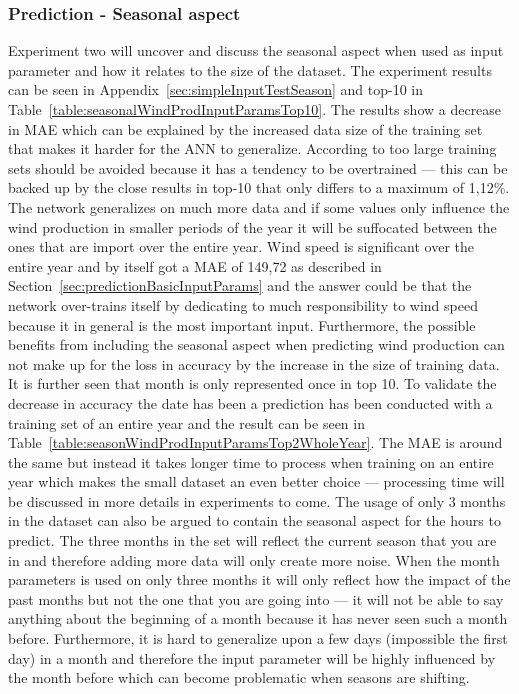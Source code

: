 \subsubsection{Prediction - Seasonal aspect}
Experiment two will uncover and discuss the seasonal aspect when used as input parameter and how it relates to the size of the dataset. The experiment results can be seen in Appendix~\ref{sec:simpleInputTestSeason} and top-10 in Table~\ref{table:seasonalWindProdInputParamsTop10}. The results show a decrease in MAE which can be explained by the increased data size of the training set that makes it harder for the ANN to generalize. According to\cite{1} too large training sets should be avoided because it has a tendency to be overtrained --- this can be backed up by the close results in top-10 that only differs to a maximum of 1,12\%. The network generalizes on much more data and if some values only influence the wind production in smaller periods of the year it will be suffocated between the ones that are import over the entire year. Wind speed is significant over the entire year and by itself got a MAE of 149,72 as described in Section~\ref{sec:predictionBasicInputParams} and the answer could be that the network over-trains itself by dedicating to much responsibility to wind speed because it in general is the most important input. 
Furthermore, the possible benefits from including the seasonal aspect when predicting wind production can not make up for the loss in accuracy by the increase in the size of training data. It is further seen that month is only represented once in top 10. To validate the decrease in accuracy the date has been a prediction has been conducted with a training set of an entire year and the result can be seen in Table~\ref{table:seasonWindProdInputParamsTop2WholeYear}. The MAE is around the same but instead it takes longer time to process when training on an entire year which makes the small dataset an even better choice --- processing time will be discussed in more details in experiments to come. The usage of only 3 months in the dataset can also be argued to contain the seasonal aspect for the hours to predict. The three months in the set will reflect the current season that you are in and therefore adding more data will only create more noise. When the month parameters is used on only three months it will only reflect how the impact of the past months but not the one that you are going into --- it will not be able to say anything about the beginning of a month because it has never seen such a month before. Furthermore, it is hard to generalize upon a few days (impossible the first day) in a month and therefore the input parameter will be highly influenced by the month before which can become problematic when seasons are shifting.

